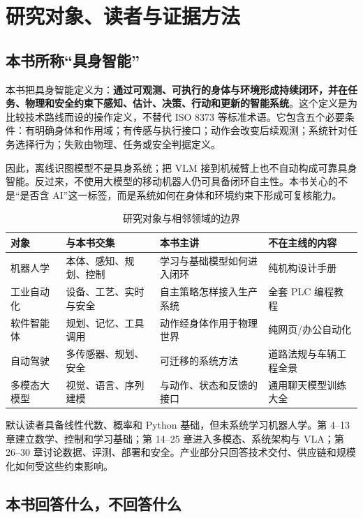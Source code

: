 \chapter{研究对象、读者与证据方法}
\label{chap:scope-evidence-method}

\section{本书所称“具身智能”}

本书把具身智能定义为：\textbf{通过可观测、可执行的身体与环境形成持续闭环，并在任务、物理和安全约束下感知、估计、决策、行动和更新的智能系统}。这个定义是为比较技术路线而设的操作定义，不替代 ISO 8373 等标准术语\cite{iso8373_2021}。它包含五个必要条件：有明确身体和作用域；有传感与执行接口；动作会改变后续观测；系统针对任务选择行为；失败由物理、任务或安全判据定义。

因此，离线识图模型不是具身系统；把 VLM 接到机械臂上也不自动构成可靠具身智能。反过来，不使用大模型的移动机器人仍可具备闭环自主性。本书关心的不是“是否含 AI”这一标签，而是系统如何在身体和环境约束下形成可复核能力。

\begin{table}[H]
\begingroup
{}
\centering
\caption{研究对象与相邻领域的边界}
\label{tab:scope-boundaries}
\begin{tabularx}{\textwidth}{p{}YYY}
\toprule
对象 & 与本书交集 & 本书主讲 & 不在主线的内容 \\
\midrule
机器人学 & 本体、感知、规划、控制 & 学习与基础模型如何进入闭环 & 纯机构设计手册 \\
工业自动化 & 设备、工艺、实时与安全 & 自主策略怎样接入生产系统 & 全套 PLC 编程教程 \\
软件智能体 & 规划、记忆、工具调用 & 动作经身体作用于物理世界 & 纯网页/办公自动化 \\
自动驾驶 & 多传感器、规划、安全 & 可迁移的系统方法 & 道路法规与车辆工程全景 \\
多模态大模型 & 视觉、语言、序列建模 & 与动作、状态和反馈的接口 & 通用聊天模型训练大全 \\
\bottomrule
\end{tabularx}
\endgroup
\end{table}

默认读者具备线性代数、概率和 Python 基础，但未系统学习机器人学。第 4–13 章建立数学、控制和学习基础；第 14–25 章进入多模态、系统架构与 VLA；第 26–30 章讨论数据、评测、部署和安全。产业部分只回答技术交付、供应链和规模化如何受这些约束影响。

\section{本书回答什么，不回答什么}

